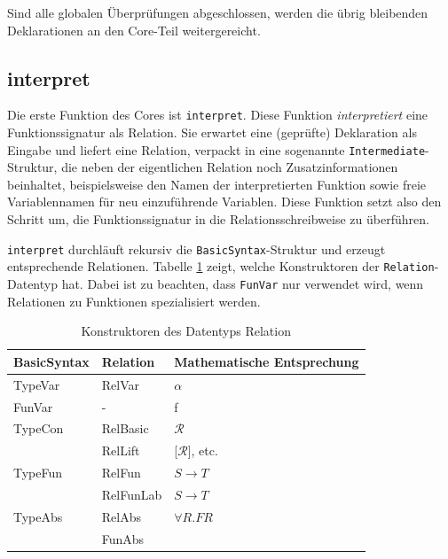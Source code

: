 Sind alle globalen Überprüfungen abgeschlossen, werden die übrig bleibenden Deklarationen an den Core-Teil weitergereicht.


\subsection{interpret}

\label{sec:free-theorems-interpret}

Die erste Funktion des Cores ist \texttt{interpret}. Diese Funktion \textit{interpretiert} eine Funktionssignatur als Relation. Sie
erwartet eine (geprüfte) Deklaration als Eingabe und liefert eine Relation, verpackt in eine sogenannte \texttt{Intermediate}-Struktur,
die neben der eigentlichen Relation noch Zusatzinformationen beinhaltet, beispielsweise den Namen der interpretierten Funktion
sowie freie Variablennamen für neu einzuführende Variablen.
Diese Funktion setzt also den Schritt um, die Funktionssignatur in die Relationsschreibweise zu überführen.

\texttt{interpret} durchläuft rekursiv die \texttt{BasicSyntax}-Struktur und erzeugt entsprechende Relationen.
Tabelle \ref{tab:relations} zeigt, welche Konstruktoren der \texttt{Relation}-Datentyp hat. Dabei ist zu beachten, dass
\texttt{FunVar} nur verwendet wird, wenn Relationen zu Funktionen spezialisiert werden. 

\begin{table}
\centering
\begin{tabular}{| l | l | l |}
\hline
BasicSyntax & Relation & Mathematische Entsprechung\\
\hline
TypeVar & RelVar & $\alpha$ \\
FunVar & - & f \\
TypeCon & RelBasic & $\mathcal{R}$ \\
& RelLift & [$\mathcal{R}$], etc. \\
TypeFun & RelFun & $S \rightarrow T$ \\
& RelFunLab & $S \rightarrow T$ \\
TypeAbs & RelAbs & $\forall R . F R$ \\
& FunAbs &\\
\hline
\end{tabular}
\caption{Konstruktoren des Datentyps Relation}
\label{tab:relations}
\end{table}

